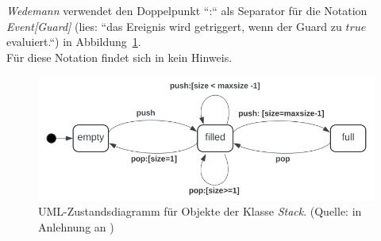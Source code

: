 \vspace{5mm}
\begin{tcolorbox}[colback=red!20,title={Notation für \textit{Event[Guard]}}]
    \textit{Wedemann} verwendet den Doppelpunkt ``:`` als Separator für die Notation \textit{Event[Guard]} (lies: ``das Ereignis wird getriggert, wenn der Guard zu $true$ evaluiert.``) in Abbildung~\ref{fig:popstate}.\\
    Für diese Notation findet sich in \cite[320 f.]{OMG17} kein Hinweis.
\end{tcolorbox}
\vspace{5mm}

\begin{figure}
    \centering
    \includegraphics[scale=0.5]{part four/Testende Verfahren/img/popstate}
    \caption{UML-Zustandsdiagramm für Objekte der Klasse \textit{Stack}. (Quelle: in Anlehnung an \cite[Abb. 5.1, 47]{Wed09c})}
    \label{fig:popstate}
\end{figure}

